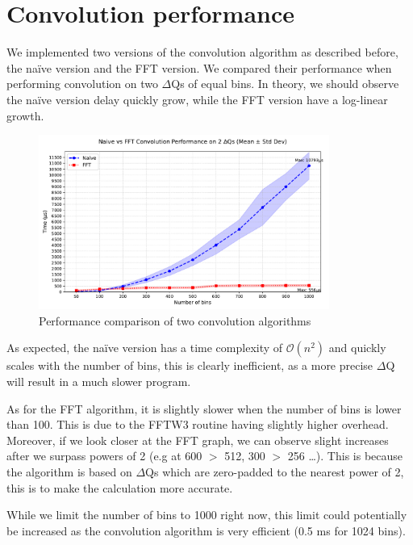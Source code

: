 \section{Convolution performance}
    We implemented two versions of the convolution algorithm as described before, the naïve version and the FFT version. We compared their performance when performing convolution on two $\Delta$Qs of equal bins. In theory, we should observe the naïve version delay quickly grow, while the FFT version have a log-linear growth.
    \begin{figure}[H]
        \begin{center}
            \includegraphics[width=0.85\textwidth]{img/conv_perf.pdf}
        \end{center}
        \caption{Performance comparison of two convolution algorithms}\label{fig:conv_perf}
    \end{figure}

    As expected, the naïve version has a time complexity of $\mathcal{O}(n^2)$ and quickly scales with the number of bins, this is clearly inefficient, as a more precise $\Delta$Q will result in a much slower program.

As for the FFT algorithm, it is slightly slower when the number of bins is lower than 100. This is due to the FFTW3 routine having slightly higher overhead. Moreover, if we look closer at the FFT graph, we can observe slight increases after we surpass powers of 2 (e.g at 600 $>$ 512, 300 $>$ 256 \dots). This is because the algorithm is based on $\Delta$Qs which are zero-padded to the nearest power of 2, this is to make the calculation more accurate.

While we limit the number of bins to 1000 right now, this limit could potentially be increased as the convolution algorithm is very efficient (0.5 ms for 1024 bins).
